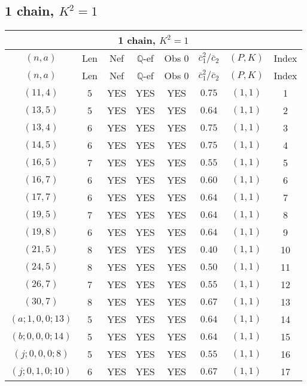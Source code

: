 \subsection{1 chain, $K^2 = 1$}
\begin{longtable}{|c|c|c|c|c|c|c|c|}
\hline
\multicolumn{8}{|c|}{1 chain, $K^2 = 1$}\\
\hline
$(n,a)$ & Len & Nef & $\mathbb Q$-ef & Obs 0 & $\overline c_1^2 / \overline c_2$ & $(P,K)$ & Index\\
\hline
\endfirsthead

\hline
$(n,a)$ & Len & Nef & $\mathbb Q$-ef & Obs 0 & $\overline c_1^2 / \overline c_2$ & $(P,K)$ & Index\\
\hline
\endhead
\hline
\endfoot

$(11,4)$ & 5 & YES & YES & YES & $0.75$ & $(1,1)$ & 1\\
$(13,5)$ & 5 & YES & YES & YES & $0.64$ & $(1,1)$ & 2\\
$(13,4)$ & 6 & YES & YES & YES & $0.75$ & $(1,1)$ & 3\\
$(14,5)$ & 6 & YES & YES & YES & $0.75$ & $(1,1)$ & 4\\
$(16,5)$ & 7 & YES & YES & YES & $0.55$ & $(1,1)$ & 5\\
$(16,7)$ & 6 & YES & YES & YES & $0.60$ & $(1,1)$ & 6\\
$(17,7)$ & 6 & YES & YES & YES & $0.64$ & $(1,1)$ & 7\\
$(19,5)$ & 7 & YES & YES & YES & $0.64$ & $(1,1)$ & 8\\
$(19,8)$ & 6 & YES & YES & YES & $0.64$ & $(1,1)$ & 9\\
$(21,5)$ & 8 & YES & YES & YES & $0.40$ & $(1,1)$ & 10\\
$(24,5)$ & 8 & YES & YES & YES & $0.50$ & $(1,1)$ & 11\\
$(26,7)$ & 7 & YES & YES & YES & $0.55$ & $(1,1)$ & 12\\
$(30,7)$ & 8 & YES & YES & YES & $0.67$ & $(1,1)$ & 13\\
$(a;1,0,0;13)$ & 5 & YES & YES & YES & $0.64$ & $(1,1)$ & 14\\
$(b;0,0,0;14)$ & 5 & YES & YES & YES & $0.64$ & $(1,1)$ & 15\\
$(j;0,0,0;8)$ & 5 & YES & YES & YES & $0.55$ & $(1,1)$ & 16\\
$(j;0,1,0;10)$ & 6 & YES & YES & YES & $0.67$ & $(1,1)$ & 17
\end{longtable}
